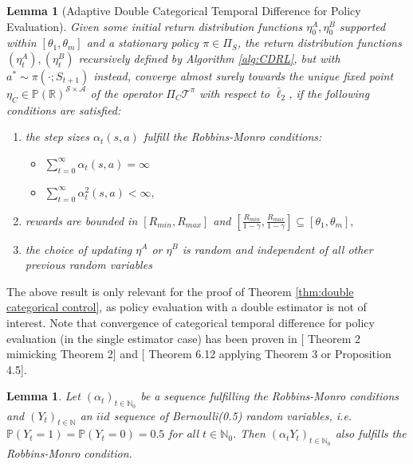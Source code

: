 \documentclass{article}
\newcommand{\cA}{\mathcal{A}}
\newcommand{\cP}{\mathbb{P}}
\newcommand{\cS}{\mathcal{S}}
\newcommand{\cT}{\mathcal{T}}
\newcommand{\N}{\mathbb{N}}
\newcommand{\R}{\mathbb{R}}
\theoremstyle{plain}
\newtheorem{lemma}[theorem]{Lemma}
\theoremstyle{definition}
\theoremstyle{remark}
\begin{document}
\begin{lemma}[Adaptive Double Categorical Temporal Difference for Policy Evaluation]\label{lem: double categorical policy evaluation}
    Given some initial return distribution functions $\eta_0^{A},\eta^{B}_0$ supported within $[\theta_1,\theta_m]$ and a stationary policy $\pi\in\Pi_S$, the return distribution functions $(\eta_t^{A}),(\eta^{B}_t)$ recursively defined by Algorithm \ref{alg:CDRL}, but with $a^*\sim\pi(\cdot;S_{t+1})$ instead,
    converge almost surely towards the unique fixed point $\eta_C\in\cP(\R)^{\cS\times\cA}$ of the operator $\Pi_C\cT^\pi$ with respect to $\bar\ell_2$, if the following conditions are satisfied:
\begin{enumerate}
	\item the step sizes $\alpha_t(s,a)$ fulfill the Robbins-Monro conditions:
	\begin{itemize}
		\item[$\bullet$] $\sum_{t=0}^{\infty}\alpha_t(s,a)=\infty$
		\item[$\bullet$]$\sum_{t=0}^{\infty}\alpha_t^{2}(s,a)<\infty,$
	\end{itemize}
	\item rewards are bounded in $[R_{min},R_{max}]$ and $[\frac{R_{min}}{1-\gamma},\frac{R_{max}}{1-\gamma}]\subseteq[\theta_1,\theta_m],$
    \item the choice of updating $\eta^A$ or $\eta^B$ is random and independent of all other previous random variables 
\end{enumerate}
\end{lemma}
The above result is only relevant for the proof of Theorem \ref{thm:double categorical control}, as policy evaluation with a double estimator is not of interest. Note that convergence of categorical temporal difference for policy evaluation (in the single estimator case) has been proven in [\cite{rowland18} Theorem 2 mimicking \cite{Tsitsiklis1994} Theorem 2] and [\cite{drl} Theorem 6.12 applying \cite{Tsitsiklis1994} Theorem 3 or \cite{bertsekasbook} Proposition 4.5]. 
\begin{lemma}\label{lem:RM}
    Let $(\alpha_t)_{t\in\N_0}$ be a sequence fulfilling the Robbins-Monro conditions and $(Y_t)_{t\in\N}$ an $iid$ sequence of Bernoulli(0.5) random variables, i.e. $\mathbb P(Y_t=1)=\mathbb P(Y_t=0)=0.5$ for all $t\in\N_0$.
    Then $(\alpha_tY_t)_{t\in\N_0}$ also fulfills the Robbins-Monro condition.
\end{lemma}
\end{document}
